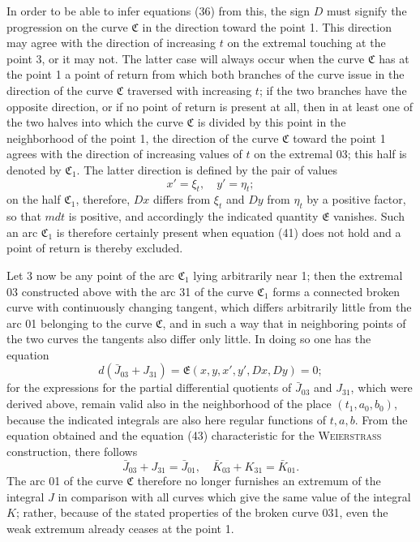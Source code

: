 \documentclass[11pt,a4paper,leqno]{article}
\begin{document}
In order to be able to infer equations (36) from this, the sign $D$ must signify the progression on the curve $\mathfrak{C}$ in the direction toward the point 1. This direction may agree with the direction of increasing $t$ on the extremal touching at the point 3, or it may not. The latter case will always occur when the curve $\mathfrak{C}$ has at the point 1 a point of return from which both branches of the curve issue in the direction of the curve $\mathfrak{C}$ traversed with increasing $t$; if the two branches have the opposite direction, or if no point of return is present at all, then in at least one of the two halves into which the curve $\mathfrak{C}$ is divided by this point in the neighborhood of the point 1, the direction of the curve $\mathfrak{C}$ toward the point 1 agrees with the direction of increasing values of $t$ on the extremal 03; this half is denoted by $\mathfrak{C}_1$. The latter direction is defined by the pair of values
\[
x'=\xi_t,
\quad y'=\eta_t;
\]
on the half $\mathfrak{C}_1$, therefore, $Dx$ differs from $\xi_t$ and $Dy$ from $\eta_t$ by a positive factor, so that $mdt$ is positive, and accordingly the indicated quantity $\mathfrak{E}$ vanishes. Such an arc $\mathfrak{C}_1$ is therefore certainly present when equation (41) does not hold and a point of return is thereby excluded.

Let 3 now be any point of the arc $\mathfrak{C}_1$ lying arbitrarily near 1; then the extremal 03 constructed above
with the arc 31 of the curve $\mathfrak{C}_1$ forms a connected broken curve with continuously changing tangent, which differs arbitrarily little from the arc 01 belonging to the curve $\mathfrak{C}$, and in such a way that in neighboring points of the two curves the tangents also differ only little. In doing so one has the equation
\[
d(\bar J_{03}+J_{31})=\mathfrak{E}(x,y,x',y',Dx,Dy)=0;
\]
for the expressions for the partial differential quotients of $\bar J_{03}$ and $J_{31}$, which were derived above, remain valid also in the neighborhood of the place $(t_1,a_0,b_0)$, because the indicated integrals are also here regular functions of $t,a,b$. From the equation obtained and the equation (43) characteristic for the \textsc{Weierstrass} construction, there follows
\[
\bar J_{03}+J_{31}=\bar J_{01},
\quad \bar K_{03}+K_{31}=\bar K_{01}.
\]
The arc 01 of the curve $\mathfrak{C}$ therefore no longer furnishes an extremum of the integral $J$ in comparison with all curves which give the same value of the integral $K$; rather, because of the stated properties of the broken curve 031, even the weak extremum already ceases at the point 1.
\end{document}
